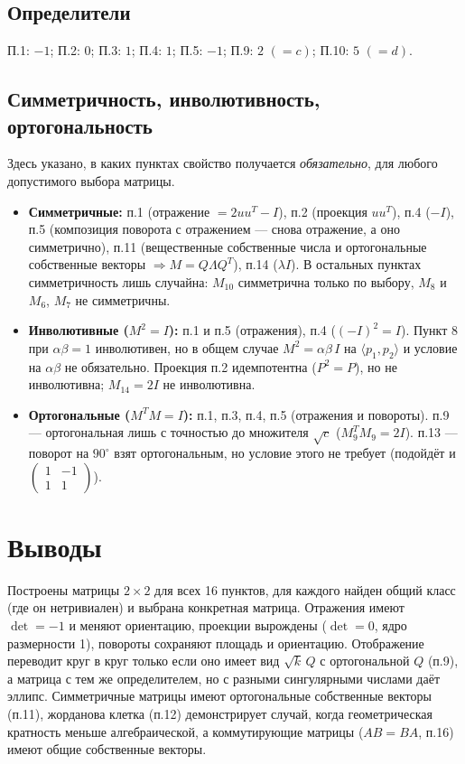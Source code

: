 \documentclass[a4paper, 12pt]{article}
\begin{document}
    \subsection{Определители}
    П.1: $-1$; П.2: $0$; П.3: $1$; П.4: $1$; П.5: $-1$; П.9: $2$ $(=c)$; П.10: $5$ $(=d)$.

    \subsection{Симметричность, инволютивность, ортогональность}
    Здесь указано, в каких пунктах свойство получается \emph{обязательно}, для любого допустимого выбора матрицы.
    \begin{itemize}
        \item \textbf{Симметричные:} п.1 (отражение $=2uu^T-I$), п.2 (проекция $uu^T$), п.4 ($-I$), п.5 (композиция поворота с отражением --- снова отражение, а оно симметрично), п.11 (вещественные собственные числа и ортогональные собственные векторы $\Rightarrow M=Q\Lambda Q^T$), п.14 ($\lambda I$). В остальных пунктах симметричность лишь случайна: $M_{10}$ симметрична только по выбору, $M_8$ и $M_6$, $M_7$ не симметричны.
        \item \textbf{Инволютивные ($M^2=I$):} п.1 и п.5 (отражения), п.4 ($(-I)^2=I$). Пункт 8 при $\alpha\beta=1$ инволютивен, но в общем случае $M^2=\alpha\beta\,I$ на $\langle p_1,p_2\rangle$ и условие на $\alpha\beta$ не обязательно. Проекция п.2 идемпотентна ($P^2=P$), но не инволютивна; $M_{14}=2I$ не инволютивна.
        \item \textbf{Ортогональные ($M^TM=I$):} п.1, п.3, п.4, п.5 (отражения и повороты). п.9 --- ортогональная лишь с точностью до множителя $\sqrt c$ ($M_9^TM_9=2I$). п.13 --- поворот на $90^\circ$ взят ортогональным, но условие этого не требует (подойдёт и $\begin{pmatrix}1&-1\\1&1\end{pmatrix}$).
    \end{itemize}

    \section{Выводы}
    Построены матрицы $2\times2$ для всех 16 пунктов, для каждого найден общий класс (где он нетривиален) и выбрана конкретная матрица. Отражения имеют $\det=-1$ и меняют ориентацию, проекции вырождены ($\det=0$, ядро размерности 1), повороты сохраняют площадь и ориентацию. Отображение переводит круг в круг только если оно имеет вид $\sqrt k\,Q$ с ортогональной $Q$ (п.9), а матрица с тем же определителем, но с разными сингулярными числами даёт эллипс. Симметричные матрицы имеют ортогональные собственные векторы (п.11), жорданова клетка (п.12) демонстрирует случай, когда геометрическая кратность меньше алгебраической, а коммутирующие матрицы ($AB=BA$, п.16) имеют общие собственные векторы.
\end{document}
